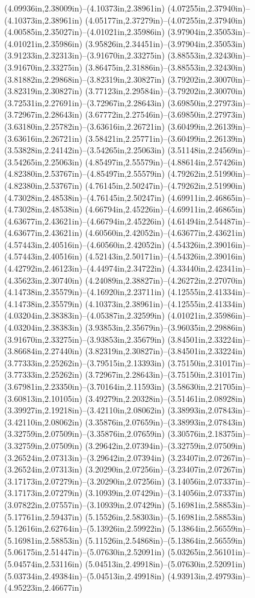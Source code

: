 (4.09936in,2.38009in)--(4.10373in,2.38961in) (4.07255in,2.37940in)--(4.10373in,2.38961in) (4.05177in,2.37279in)--(4.07255in,2.37940in) (4.00585in,2.35027in)--(4.01021in,2.35986in) (3.97904in,2.35053in)--(4.01021in,2.35986in) (3.95826in,2.34451in)--(3.97904in,2.35053in) (3.91233in,2.32313in)--(3.91670in,2.33275in) (3.88553in,2.32430in)--(3.91670in,2.33275in) (3.86475in,2.31886in)--(3.88553in,2.32430in) (3.81882in,2.29868in)--(3.82319in,2.30827in) (3.79202in,2.30070in)--(3.82319in,2.30827in) (3.77123in,2.29584in)--(3.79202in,2.30070in) (3.72531in,2.27691in)--(3.72967in,2.28643in) (3.69850in,2.27973in)--(3.72967in,2.28643in) (3.67772in,2.27546in)--(3.69850in,2.27973in) (3.63180in,2.25782in)--(3.63616in,2.26721in) (3.60499in,2.26139in)--(3.63616in,2.26721in) (3.58421in,2.25771in)--(3.60499in,2.26139in) (3.53828in,2.24142in)--(3.54265in,2.25063in) (3.51148in,2.24569in)--(3.54265in,2.25063in) (4.85497in,2.55579in)--(4.88614in,2.57426in) (4.82380in,2.53767in)--(4.85497in,2.55579in) (4.79262in,2.51990in)--(4.82380in,2.53767in) (4.76145in,2.50247in)--(4.79262in,2.51990in) (4.73028in,2.48538in)--(4.76145in,2.50247in) (4.69911in,2.46865in)--(4.73028in,2.48538in) (4.66794in,2.45226in)--(4.69911in,2.46865in) (4.63677in,2.43621in)--(4.66794in,2.45226in) (4.61494in,2.54487in)--(4.63677in,2.43621in) (4.60560in,2.42052in)--(4.63677in,2.43621in) (4.57443in,2.40516in)--(4.60560in,2.42052in) (4.54326in,2.39016in)--(4.57443in,2.40516in) (4.52143in,2.50171in)--(4.54326in,2.39016in) (4.42792in,2.46123in)--(4.44974in,2.34722in) (4.33440in,2.42341in)--(4.35623in,2.30740in) (4.24089in,2.38827in)--(4.26272in,2.27070in) (4.14738in,2.35579in)--(4.16920in,2.23711in) (4.12555in,2.41334in)--(4.14738in,2.35579in) (4.10373in,2.38961in)--(4.12555in,2.41334in) (4.03204in,2.38383in)--(4.05387in,2.32599in) (4.01021in,2.35986in)--(4.03204in,2.38383in) (3.93853in,2.35679in)--(3.96035in,2.29886in) (3.91670in,2.33275in)--(3.93853in,2.35679in) (3.84501in,2.33224in)--(3.86684in,2.27440in) (3.82319in,2.30827in)--(3.84501in,2.33224in) (3.77333in,2.25262in)--(3.79515in,2.13393in) (3.75150in,2.31017in)--(3.77333in,2.25262in) (3.72967in,2.28643in)--(3.75150in,2.31017in) (3.67981in,2.23350in)--(3.70164in,2.11593in) (3.58630in,2.21705in)--(3.60813in,2.10105in) (3.49279in,2.20328in)--(3.51461in,2.08928in) (3.39927in,2.19218in)--(3.42110in,2.08062in) (3.38993in,2.07843in)--(3.42110in,2.08062in) (3.35876in,2.07659in)--(3.38993in,2.07843in) (3.32759in,2.07509in)--(3.35876in,2.07659in) (3.30576in,2.18375in)--(3.32759in,2.07509in) (3.29642in,2.07394in)--(3.32759in,2.07509in) (3.26524in,2.07313in)--(3.29642in,2.07394in) (3.23407in,2.07267in)--(3.26524in,2.07313in) (3.20290in,2.07256in)--(3.23407in,2.07267in) (3.17173in,2.07279in)--(3.20290in,2.07256in) (3.14056in,2.07337in)--(3.17173in,2.07279in) (3.10939in,2.07429in)--(3.14056in,2.07337in) (3.07822in,2.07557in)--(3.10939in,2.07429in) (5.16981in,2.58853in)--(5.17761in,2.59437in) (5.15526in,2.58303in)--(5.16981in,2.58853in) (5.12616in,2.62764in)--(5.13926in,2.59922in) (5.13864in,2.56559in)--(5.16981in,2.58853in) (5.11526in,2.54868in)--(5.13864in,2.56559in) (5.06175in,2.51447in)--(5.07630in,2.52091in) (5.03265in,2.56101in)--(5.04574in,2.53116in) (5.04513in,2.49918in)--(5.07630in,2.52091in) (5.03734in,2.49384in)--(5.04513in,2.49918in) (4.93913in,2.49793in)--(4.95223in,2.46677in) 